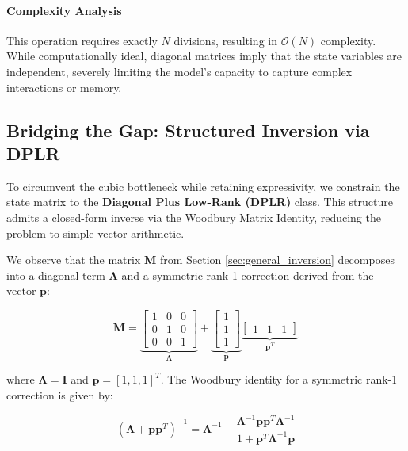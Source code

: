 \documentclass[a4paper,11pt]{article}
\begin{document}
\paragraph{Complexity Analysis}
This operation requires exactly $N$ divisions, resulting in $\mathcal{O}(N)$ complexity. While computationally ideal, diagonal matrices imply that the state variables are independent, severely limiting the model's capacity to capture complex interactions or memory.

\subsection{Bridging the Gap: Structured Inversion via DPLR}
\label{sec:dplr_structure}

To circumvent the cubic bottleneck while retaining expressivity, we constrain the state matrix to the \textbf{Diagonal Plus Low-Rank (DPLR)} class. This structure admits a closed-form inverse via the Woodbury Matrix Identity, reducing the problem to simple vector arithmetic.

We observe that the matrix $\mathbf{M}$ from Section \ref{sec:general_inversion} decomposes into a diagonal term $\mathbf{\Lambda}$ and a symmetric rank-1 correction derived from the vector $\mathbf{p}$:

\begin{equation} \label{eq:dplr_decomposition}
    \mathbf{M} = \underbrace{\begin{bmatrix}
    1 & 0 & 0 \\
    0 & 1 & 0 \\
    0 & 0 & 1
    \end{bmatrix}}_{\mathbf{\Lambda}} + \underbrace{\begin{bmatrix}
    1 \\ 1 \\ 1
    \end{bmatrix}}_{\mathbf{p}} \underbrace{\begin{bmatrix}
    1 & 1 & 1
    \end{bmatrix}}_{\mathbf{p}^T}
\end{equation}

where $\mathbf{\Lambda} = \mathbf{I}$ and $\mathbf{p} = [1, 1, 1]^T$. The Woodbury identity for a symmetric rank-1 correction is given by:

\begin{equation} \label{eq:woodbury_identity}
    (\mathbf{\Lambda} + \mathbf{p}\mathbf{p}^T)^{-1} = \mathbf{\Lambda}^{-1} - \frac{\mathbf{\Lambda}^{-1}\mathbf{p}\mathbf{p}^T\mathbf{\Lambda}^{-1}}{1 + \mathbf{p}^T\mathbf{\Lambda}^{-1}\mathbf{p}}
\end{equation}
\end{document}
